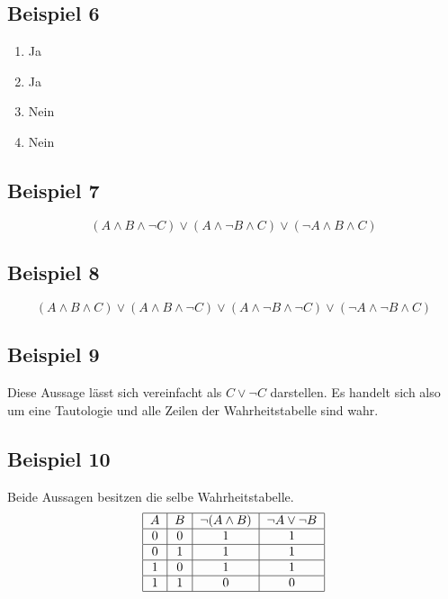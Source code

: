 \documentclass[12pt, a4paper, oneside]{article}
\begin{document}
\subsection{Beispiel 6}
\begin{enumerate}
  \item Ja
  \item Ja
  \item Nein
  \item Nein
\end{enumerate}

\subsection{Beispiel 7}
\begin{equation}
  (A \land B \land \lnot C) \lor (A \land \lnot B \land C) \lor (\lnot A \land B \land C)
\end{equation}

\subsection{Beispiel 8}
\begin{equation}
  (A \land B \land C) \lor (A \land B \land \lnot C) \lor (A \land \lnot B \land \lnot C) \lor (\lnot A \land \lnot B \land C)
\end{equation}

\subsection{Beispiel 9}
  Diese Aussage lässt sich vereinfacht als $C \lor \lnot C$ darstellen. Es handelt sich also um eine Tautologie und alle Zeilen der Wahrheitstabelle sind wahr.

\subsection{Beispiel 10}
Beide Aussagen besitzen die selbe Wahrheitstabelle.
\begin{equation}
  \begin{tabular}{|c|c|c|c|}
    \hline
    $A$ & $B$ & $\lnot(A \land B)$ & $\lnot A \lor \lnot B$ \\ \hline
    0 & 0 & 1 & 1 \\ \hline
    0 & 1 & 1 & 1 \\ \hline
    1 & 0 & 1 & 1 \\ \hline
    1 & 1 & 0 & 0 \\ \hline
  \end{tabular}
\end{equation}
\end{document}
